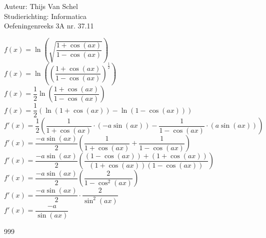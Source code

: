 \documentclass[a4paper]{article}
\begin{document}
  
\noindent \large Auteur: Thijs Van Schel\\
\noindent \large Studierichting: Informatica\\
\noindent \large Oefeningenreeks 3A nr. 37.11 \\

\medskip

\normalsize

$f(x) = \ln\left(\sqrt{\dfrac{1+\cos(ax)}{1-\cos(ax)}}\right)$\\

$f(x) = \ln\left(\left(\dfrac{1+\cos(ax)}{1-\cos(ax)}\right)^{\tfrac{1}{2}}\right)$\\

$f(x) = \dfrac{1}{2} \ln\left(\dfrac{1+\cos(ax)}{1-\cos(ax)}\right)$\\

$f(x) = \dfrac{1}{2} \left( \ln(1+\cos(ax)) - \ln(1-\cos(ax)) \right)$\\

$f'(x) = \dfrac{1}{2} \left( \dfrac{1}{1+\cos(ax)} \cdot (-a\sin(ax)) - \dfrac{1}{1-\cos(ax)} \cdot (a\sin(ax)) \right)$\\

$f'(x) = \dfrac{-a\sin(ax)}{2} \left( \dfrac{1}{1+\cos(ax)} + \dfrac{1}{1-\cos(ax)} \right)$\\

$f'(x) = \dfrac{-a\sin(ax)}{2} \left( \dfrac{(1-\cos(ax)) + (1+\cos(ax))}{(1+\cos(ax))(1-\cos(ax))} \right)$\\

$f'(x) = \dfrac{-a\sin(ax)}{2} \left( \dfrac{2}{1-\cos^2(ax)} \right)$\\

$f'(x) = \dfrac{-a\sin(ax)}{2} \cdot \dfrac{2}{\sin^2(ax)}$\\

$f'(x) = \dfrac{-a}{\sin(ax)}$\\

\begin{thebibliography}{999}
\end{thebibliography}
\end{document}
